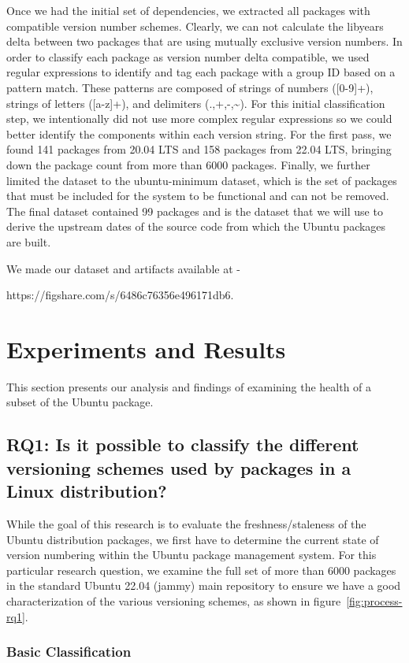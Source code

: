 \documentclass[sn-mathphys-num]{sn-jnl}%
\theoremstyle{thmstyleone}%
\theoremstyle{thmstyletwo}%
\theoremstyle{thmstylethree}%
\begin{document}
Once we had the initial set of dependencies, we extracted all packages with compatible version number schemes. Clearly, we can not calculate the libyears delta between two packages that are using mutually exclusive version numbers. In order to classify each package as version number delta compatible, we used regular expressions to identify and tag each package with a group ID based on a pattern match. These patterns are composed of strings of numbers ([0-9]+), strings of letters ([a-z]+), and delimiters (.,+,-,\textasciitilde). For this initial classification step, we intentionally did not use more complex regular expressions so we could better identify the components within each version string. For the first pass, we found 141 packages from 20.04 LTS and 158 packages from 22.04 LTS, bringing down the package count from more than 6000 packages. Finally, we further limited the dataset to the ubuntu-minimum dataset, which is the set of packages that must be included for the system to be functional and can not be removed. The final dataset contained 99 packages and is the dataset that we will use to derive the upstream dates of the source code from which the Ubuntu packages are built.

We made our dataset and artifacts available at - 

https://figshare.com/s/6486c76356e496171db6.


\section{Experiments and Results}
This section presents our analysis and findings of examining the health of a subset of the Ubuntu package. 

\subsection{\textbf{RQ1: Is it possible to classify the different versioning schemes used by packages in a Linux distribution?}}
While the goal of this research is to evaluate the freshness/staleness of the Ubuntu distribution packages, we first have to determine the current state of version numbering within the Ubuntu package management system. For this particular research question, we examine the full set of more than 6000 packages in the standard Ubuntu 22.04 (jammy) main repository to ensure we have a good characterization of the various versioning schemes, as shown in figure~\ref{fig:process-rq1}. 

\subsubsection{\textbf{Basic Classification}}
\end{document}
